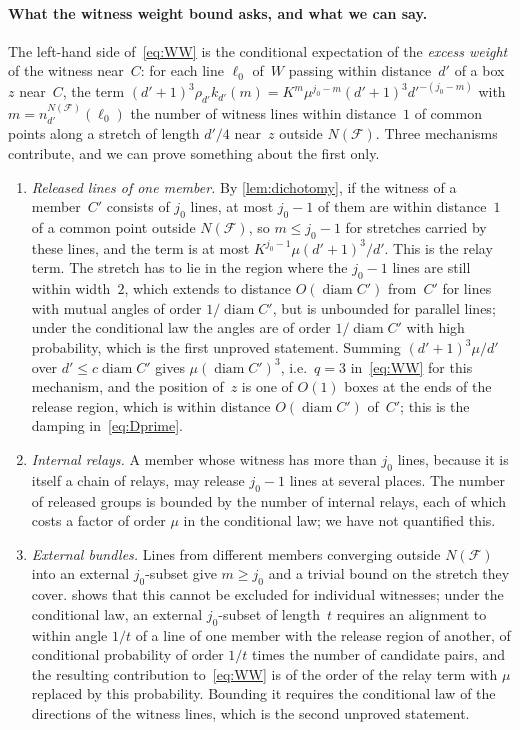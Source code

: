 \documentclass[11pt,letterpaper]{article}
\DeclareMathOperator{\diam}{diam}
\begin{document}
\paragraph{What the witness weight bound asks, and what we can say.} The left-hand side of~\eqref{eq:WW} is the conditional expectation of the \emph{excess weight} of the witness near~$C$: for each line $\ell_0$ of~$W$ passing within distance~$d'$ of a box~$z$ near~$C$, the term $(d'+1)^3\rho_{d'}k_{d'}(m)=K^m\mu^{j_0-m}(d'+1)^3d'^{-(j_0-m)}$ with $m=n^{N(\mathcal F)}_{d'}(\ell_0)$ the number of witness lines within distance~$1$ of common points along a stretch of length $d'/4$ near~$z$ outside $N(\mathcal F)$. Three mechanisms contribute, and we can prove something about the first only.
\begin{enumerate}
  \item \emph{Released lines of one member.} By \cref{lem:dichotomy}, if the witness of a member~$C'$ consists of $j_0$ lines, at most $j_0-1$ of them are within distance~$1$ of a common point outside $N(\mathcal F)$, so $m\le j_0-1$ for stretches carried by these lines, and the term is at most $K^{j_0-1}\mu(d'+1)^3/d'$. This is the relay term. The stretch has to lie in the region where the $j_0-1$ lines are still within width~$2$, which extends to distance $O(\diam C')$ from~$C'$ for lines with mutual angles of order $1/\diam C'$, but is unbounded for parallel lines; under the conditional law the angles are of order $1/\diam C'$ with high probability, which is the first unproved statement. Summing $(d'+1)^3\mu/d'$ over $d'\le c\diam C'$ gives $\mu(\diam C')^3$, i.e.\ $q=3$ in~\eqref{eq:WW} for this mechanism, and the position of~$z$ is one of $O(1)$ boxes at the ends of the release region, which is within distance $O(\diam C')$ of~$C'$; this is the damping in~\eqref{eq:Dprime}.
  \item \emph{Internal relays.} A member whose witness has more than $j_0$ lines, because it is itself a chain of relays, may release $j_0-1$ lines at several places. The number of released groups is bounded by the number of internal relays, each of which costs a factor of order $\mu$ in the conditional law; we have not quantified this.
  \item \emph{External bundles.} Lines from different members converging outside $N(\mathcal F)$ into an external $j_0$-subset give $m\ge j_0$ and a trivial bound on the stretch they cover.  shows that this cannot be excluded for individual witnesses; under the conditional law, an external $j_0$-subset of length~$t$ requires an alignment to within angle $1/t$ of a line of one member with the release region of another, of conditional probability of order $1/t$ times the number of candidate pairs, and the resulting contribution to~\eqref{eq:WW} is of the order of the relay term with $\mu$ replaced by this probability. Bounding it requires the conditional law of the directions of the witness lines, which is the second unproved statement.
\end{enumerate}
\end{document}
